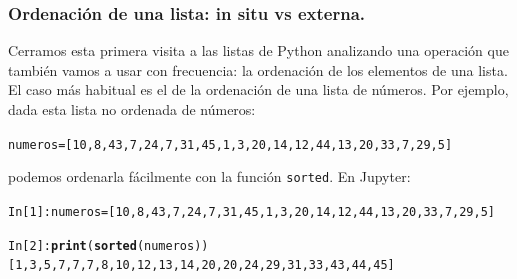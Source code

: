 \documentclass[10pt,a4paper]{article}\usepackage[]{graphicx}\usepackage[]{color}
\makeatletter
\newcommand{\hlkwd}[1]{\textcolor[rgb]{0.737,0.353,0.396}{\textbf{#1}}}%
\newenvironment{kframe}{%
 \def\at@end@of@kframe{}%
 \ifinner\ifhmode%
  \def\at@end@of@kframe{\end{minipage}}%
  \begin{minipage}{\columnwidth}%
 \fi\fi%
 \def\FrameCommand##1{\hskip\@totalleftmargin \hskip-\fboxsep
 \colorbox{shadecolor}{##1}\hskip-\fboxsep
     \hskip-\linewidth \hskip-\@totalleftmargin \hskip\columnwidth}%
 \MakeFramed {\advance\hsize-\width
   \@totalleftmargin\z@ \linewidth\hsize
   \@setminipage}}%
 {\par\unskip\endMakeFramed%
 \at@end@of@kframe}
\newenvironment{knitrout}{}{} %
\makeatother
\begin{document}

\subsubsection*{Ordenación de una lista: in situ vs externa.}
\label{tut02:subsubsec:ordenacionLista}

Cerramos esta primera visita a las listas de Python analizando una operación que también vamos a usar con frecuencia: la ordenación de los elementos de una lista. El caso más habitual es el de la ordenación de una lista de números. Por ejemplo, dada esta lista no ordenada de números:



\begin{knitrout}
\color{fgcolor}\begin{kframe}
\begin{alltt}
numeros = [10, 8, 43, 7, 24, 7, 31, 45, 1, 3, 20, 14, 12, 44, 13, 20, 33, 7, 29, 5]
\end{alltt}
\end{kframe}
\end{knitrout}

podemos ordenarla fácilmente con la función {\tt sorted}. En Jupyter:

\begin{knitrout}
\color{fgcolor}\begin{kframe}
\begin{alltt}
In [1]: numeros = [10, 8, 43, 7, 24, 7, 31, 45, 1, 3, 20, 14, 12, 44, 13, 20, 33, 7, 29, 5]

In [2]: \hlkwd{print}(\hlkwd{sorted}(numeros))
[1, 3, 5, 7, 7, 7, 8, 10, 12, 13, 14, 20, 20, 24, 29, 31, 33, 43, 44, 45]
\end{alltt}
\end{kframe}
\end{knitrout}
\end{document}
